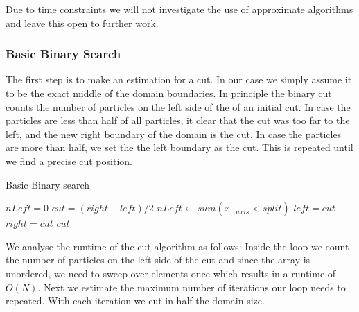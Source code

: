 \documentclass[]{article}
\begin{document}
 Due to time constraints we will not investigate the use of approximate algorithms and leave this open to further work.

\subsubsection{Basic Binary Search}

The first step is to make an estimation for a cut. In our case we simply assume it to be the exact middle of the domain boundaries. In principle the binary cut counts the number of particles on the left side of the of an initial cut. In case the particles are less than half of all particles, it clear that the cut was too far to the left, and the new right boundary of the domain is the cut. In case the particles are more than half, we set the the left boundary as the cut. This is repeated until we find a precise cut position.




\begin{algorithm}[H]
	\caption{Basic Binary search}\label{algo:cut}
	\begin{algorithmic}[1]
		\State $nLeft = 0$
		\newline
		\State $cut = (right + left ) / 2 $
		\State $nLeft\gets sum(x_{:,axis} < split)$
		\newline
		\State $left = cut$
		\Else 
		\State $right = cut$
		\EndIf
		\newline
		\EndWhile\label{euclidendwhile}
		\State \Return $cut$
		\EndProcedure
	\end{algorithmic}
\end{algorithm}

We analyse the runtime of the cut algorithm as follows: Inside the loop we count the number of particles on the left side of the cut and since the array is unordered, we need to sweep over elements once which results in a runtime of $O(N)$. Next we estimate the maximum number of iterations our loop needs to repeated. With each iteration we cut in half the domain size.  
\end{document}
